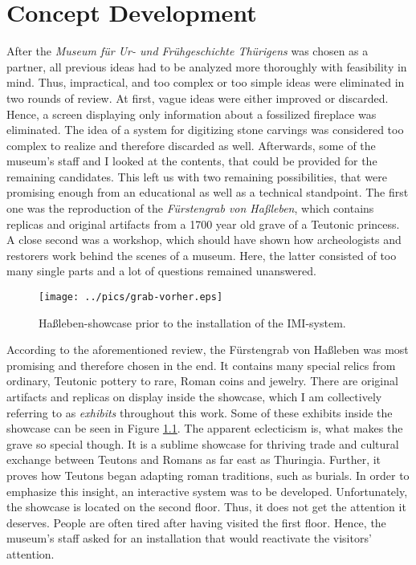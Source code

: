 \chapter{Concept Development}
\label{conception}

After the \textit{Museum für Ur- und Frühgeschichte Thürigens} was chosen as a partner, all previous ideas had to be analyzed more thoroughly with feasibility in mind. Thus, impractical, and too complex or too simple ideas were eliminated in two rounds of review. At first, vague ideas were either improved or discarded. Hence, a screen displaying only information about a fossilized fireplace was eliminated. The idea of a system for digitizing stone carvings was considered too complex to realize and therefore discarded as well. Afterwards, some of the museum's staff and I looked at the contents, that could be provided for the remaining candidates. This left us with two remaining possibilities, that were promising enough from an educational as well as a technical standpoint. The first one was the reproduction of the \textit{Fürstengrab von Haßleben}, which contains replicas and original artifacts from a 1700 year old grave of a Teutonic princess. A close second was a workshop, which should have shown how archeologists and restorers work behind the scenes of a museum. Here, the latter consisted of too many single parts and a lot of questions remained unanswered.
\begin{figure}[H] %
\centering
\texttt{[image: ../pics/grab-vorher.eps]}
\caption{Haßleben-showcase prior to the installation of the \ac{IMI}-system.}
\label{fig:conception_grave}
\end{figure}
According to the aforementioned review, the Fürstengrab von Haßleben was most promising and therefore chosen in the end. It contains many special relics from ordinary, Teutonic pottery to rare, Roman coins and jewelry. There are original artifacts and replicas on display inside the showcase, which I am collectively referring to as \textit{exhibits} throughout this work. Some of these exhibits inside the showcase can be seen in Figure \ref{fig:conception_grave}. The apparent eclecticism is, what makes the grave so special though. It is a sublime showcase for thriving trade and cultural exchange between Teutons and Romans as far east as Thuringia. Further, it proves how Teutons began adapting roman traditions, such as burials. In order to emphasize this insight, an interactive system was to be developed. Unfortunately, the showcase is located on the second floor. Thus, it does not get the attention it deserves. People are often tired after having visited the first floor. Hence, the museum's staff asked for an installation that would reactivate the visitors' attention.

